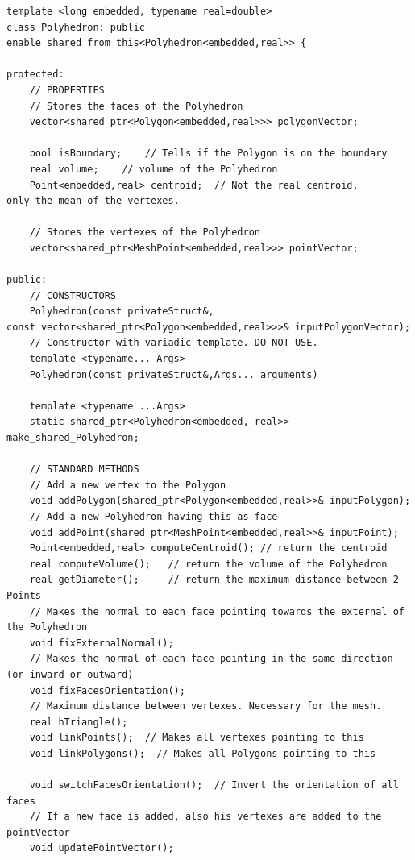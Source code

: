 \documentclass[oneside,12pt]{book}  %
\theoremstyle{plain}
\theoremstyle{definition}
\theoremstyle{remark}
\numberwithin{equation}{chapter} %
\begin{document}
\begin{verbatim}
template <long embedded, typename real=double>
class Polyhedron: public enable_shared_from_this<Polyhedron<embedded,real>> {

protected:
    // PROPERTIES
    // Stores the faces of the Polyhedron
    vector<shared_ptr<Polygon<embedded,real>>> polygonVector; 
	
    bool isBoundary;	// Tells if the Polygon is on the boundary
    real volume;	// volume of the Polyhedron
    Point<embedded,real> centroid;	// Not the real centroid, 
only the mean of the vertexes.

    // Stores the vertexes of the Polyhedron
    vector<shared_ptr<MeshPoint<embedded,real>>> pointVector;	

public:
    // CONSTRUCTORS
    Polyhedron(const privateStruct&,
const vector<shared_ptr<Polygon<embedded,real>>>& inputPolygonVector);
    // Constructor with variadic template. DO NOT USE.
    template <typename... Args>
    Polyhedron(const privateStruct&,Args... arguments)

    template <typename ...Args>
    static shared_ptr<Polyhedron<embedded, real>>
make_shared_Polyhedron;

    // STANDARD METHODS
    // Add a new vertex to the Polygon
    void addPolygon(shared_ptr<Polygon<embedded,real>>& inputPolygon);
    // Add a new Polyhedron having this as face
    void addPoint(shared_ptr<MeshPoint<embedded,real>>& inputPoint);
    Point<embedded,real> computeCentroid();	// return the centroid
    real computeVolume();	// return the volume of the Polyhedron
    real getDiameter();		// return the maximum distance between 2 Points
    // Makes the normal to each face pointing towards the external of the Polyhedron
    void fixExternalNormal();	
    // Makes the normal of each face pointing in the same direction (or inward or outward)
    void fixFacesOrientation();	
    // Maximum distance between vertexes. Necessary for the mesh.
    real hTriangle();	
    void linkPoints();	// Makes all vertexes pointing to this
    void linkPolygons();  // Makes all Polygons pointing to this

    void switchFacesOrientation();	// Invert the orientation of all faces
    // If a new face is added, also his vertexes are added to the pointVector
    void updatePointVector();	


\end{verbatim}
\end{document}
